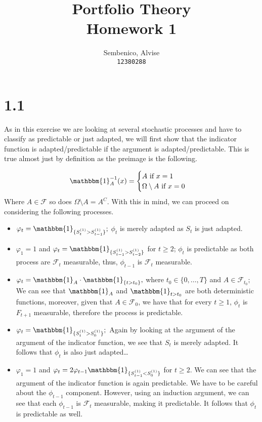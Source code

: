 \documentclass{article}
\title{Portfolio Theory\\
Homework 1}
\author{
  Sembenico, Alvise\\
  \texttt{12380288} \\  
}
\date{}
\begin{document}
\maketitle

\section{1.1}
As in this exercise we are looking at several stochastic processes and have to classify as predictable or just adapted, we will first show that the indicator function is adapted/predictable if the argument is adapted/predictable.
This is true almost just by definition as the preimage is the following.

\begin{equation}
  \mathbbm{1}_{A}^{-1}(x) = \begin{cases}
    A \text{ if }x=1                  \\
    \Omega \setminus A \text{ if }x=0 \\
  \end{cases}
\end{equation}
Where \(A \in  \mathcal{F}\) so does \(\Omega \setminus A = A^C\).
With this in mind, we can proceed on considering the following processes.
\begin{itemize}
  \item $\varphi_t = \mathbbm{1}_{\{ S_t^{(1)} > S_{t-1}^{(1)} \}};$
        \subitem \(\phi _t\) is merely adapted as \(S_t\) is just adapted.

  \item $\varphi_1 = 1$ and $\varphi_t = \mathbbm{1}_{\{ S_{t-1}^{(1)} > S_{t-2}^{(1)} \}}$ for $t \geq 2$;
        \subitem \(\phi_t\) is predictable as both process are \(\mathcal{F}_t\) measurable, thus, \(\phi _{t-1}\) is \(\mathcal{F}_t\) measurable.

  \item $\varphi_t = \mathbbm{1}_A \cdot \mathbbm{1}_{\{ t > t_0 \}},$ where $t_0 \in \{ 0, \dots, T \}$ and $A \in \mathcal{F}_{t_0};$
        \subitem We can see that \( \mathbbm{1}_A\) and \( \mathbbm{1}_{t>t_0}\) are both deterministic functions, moreover, given that \(A \in  \mathcal{F}_0\), we have that for every \(t\geq 1\), \(\phi _t\) is \(F_{t+1}\) measurable, therefore the process is predictable.

  \item $\varphi_t = \mathbbm{1}_{\{ S_t^{(1)} > S_0^{(1)} \}};$
        \subitem Again by looking at the argument of the argument of the indicator function, we see that \(S_t\) is merely adapted. It follows that \(\phi _t \) is also just adapted\dots

  \item $\varphi_1 = 1$ and $\varphi_t = 2 \varphi_{t-1} \mathbbm{1}_{\{ S_{t-1}^{(1)} < S_0^{(1)} \}}$ for $t \geq 2.$
        \subitem We can see that the argument of the indicator function is again predictable. We have to be careful about the \(\phi _{t-1}\) component. However, using an induction argument, we can see that each \(\phi _{t-1}\) is \(\mathcal{F}_{t}\) measurable, making it predictable. It follows that \(\phi _t \) is predictable as well.
\end{itemize}
\end{document}
